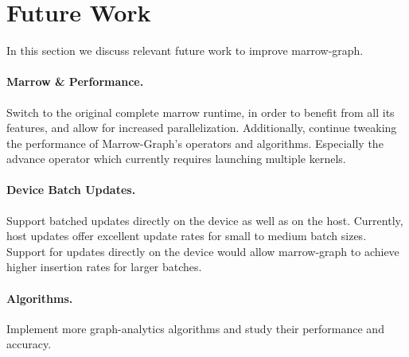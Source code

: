 






\section{Future Work}

In this section we discuss relevant future work to improve marrow-graph.








\paragraph{\textbf{Marrow \& Performance}.} Switch to the original complete marrow runtime, in order to benefit from all its features, and allow for increased parallelization. Additionally, continue tweaking the performance of Marrow-Graph's operators and algorithms. Especially the advance operator which currently requires launching multiple kernels.

\paragraph{\textbf{Device Batch Updates}.} Support batched updates directly on the device as well as on the host. Currently, host updates offer excellent update rates for small to medium batch sizes. Support for updates directly on the device would allow marrow-graph to achieve higher insertion rates for larger batches.

\paragraph{\textbf{Algorithms}.} Implement more graph-analytics algorithms and study their performance and accuracy.

